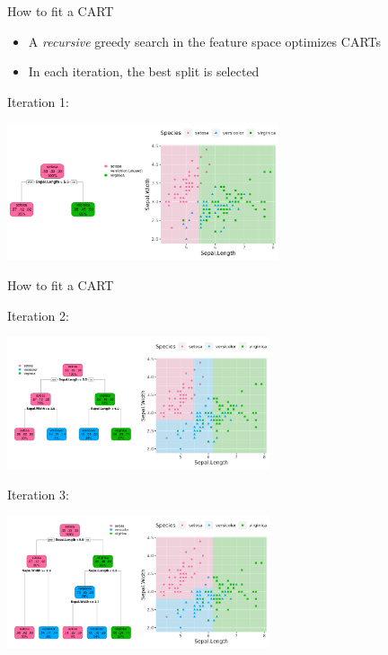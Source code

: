 \documentclass[11pt,compress,t,notes=noshow, xcolor=table]{beamer}
\begin{document}
\begin{vbframe}{How to fit a CART}

\begin{itemize} 
\item A \emph{recursive} greedy search in the feature space optimizes CARTs
\item In each iteration, the best split is selected%
\end{itemize}

Iteration 1:

{\centering \includegraphics[width=0.6\textwidth]{figure/tree-classif-depth1.pdf} 

}

\end{vbframe}

\begin{vbframe}{How to fit a CART}

Iteration 2:

{\centering \includegraphics[width=0.58\textwidth]{figure/tree-classif-depth2.pdf} 

}

Iteration 3:

{\centering \includegraphics[width=0.58\textwidth]{figure/tree-classif-depth3.pdf} 

}

\end{vbframe} 
\end{document}
